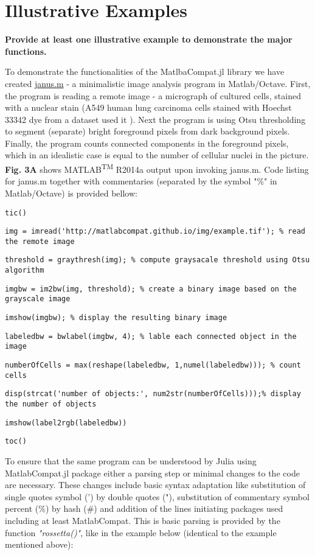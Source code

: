 \section{Illustrative Examples}
\label{} 

\textbf{Provide at least one illustrative example to demonstrate the major functions.}

To demonstrate the functionalities of the MatlbaCompat.jl library we have created \href{https://github.com/MatlabCompat/MatlabCompat.jl/blob/dev/test/janus.m}{janus.m} - a minimalistic image analysis program in Matlab/Octave. First, the program is reading a remote image - a micrograph of cultured cells, stained with a nuclear stain (A549 human lung carcinoma cells stained with Hoechst 33342 dye from a dataset used it \cite{22787215}). Next the program is using Otsu \cite{otsu1975threshold} thresholding to segment (separate) bright foreground pixels from dark background pixels. Finally, the program counts connected components in the foreground pixels, which in an idealistic case is equal to the number of cellular nuclei in the picture. \textbf{Fig. 3A} shows MATLAB\textsuperscript{TM} R2014a output upon invoking janus.m. Code listing for janus.m together with commentaries (separated by the symbol "\%" in Matlab/Octave) is provided bellow:

\verb|tic()|

\verb|img = imread('http://matlabcompat.github.io/img/example.tif'); % read the remote image|

\verb|threshold = graythresh(img); % compute graysacale threshold using Otsu algorithm|

\verb|imgbw = im2bw(img, threshold); % create a binary image based on the grayscale image|

\verb|imshow(imgbw); % display the resulting binary image|

\verb|labeledbw = bwlabel(imgbw, 4); % lable each connected object in the image|

\verb|numberOfCells = max(reshape(labeledbw, 1,numel(labeledbw))); % count cells|

\verb|disp(strcat('number of objects:', num2str(numberOfCells)));% display the number of objects|

\verb|imshow(label2rgb(labeledbw))|

\verb|toc()|

To ensure that the same program can be understood by Julia using MatlabCompat.jl package either a parsing step or minimal changes to the code are necessary. These changes include basic syntax adaptation like substitution of single quotes symbol (') by double quotes ("), substitution of commentary symbol percent (\%) by hash (\#) and addition of the lines initiating packages used including at least MatlabCompat. This is basic parsing is provided by the function \textit{"rossetta()"}, like in the example below (identical to the example mentioned above):

